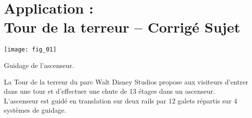 \chapter*{Application  :\\ 
Tour de la terreur -- \ifprof Corrigé \else Sujet \fi}

\iflivret {} \else
\ifprof  {} \else \fi
\fi

\setcounter{question}{0}




\begin{marginfigure}
\texttt{[image: fig\_01]}

\caption{Guidage de l'ascenseur.}
\end{marginfigure} 


La Tour de la terreur du parc Walt Disney Studios propose aux visiteurs d'entrer dans une tour et d'effectuer une chute de 13 étages dans un ascenseur.
L'ascenseur est guidé en translation sur deux rails par 12 galets répartis sur 4 systèmes de guidage.


%
%


